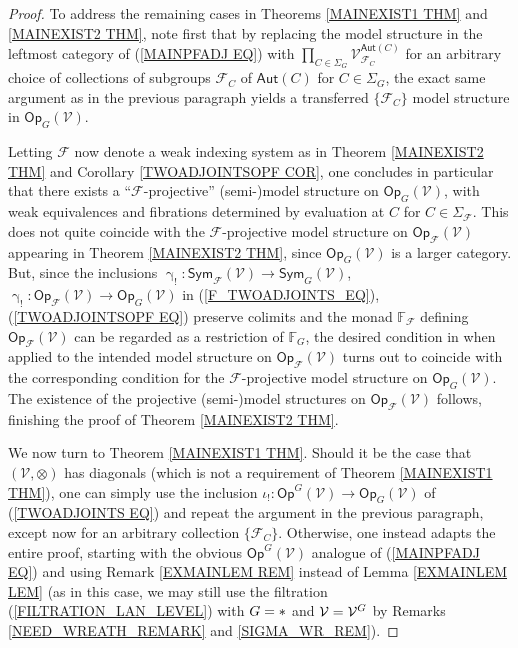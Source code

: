 \documentclass[a4paper,10pt]{article}%
\begin{document}
\begin{proof}
To address the remaining cases in 
Theorems \ref{MAINEXIST1 THM} and \ref{MAINEXIST2 THM}, note first that by replacing 
the model structure in the leftmost category of (\ref{MAINPFADJ EQ})
with
$\prod_{C \in \Sigma_G} \mathcal{V}^{\mathsf{Aut}(C)}_{\mathcal{F}_C}$
for an arbitrary choice of collections of 
subgroups $\mathcal{F}_C$ of $\mathsf{Aut}(C)$ for
$C \in \Sigma_G$, 
the exact same argument as in the previous paragraph yields a transferred 
$\{\mathcal{F}_C\}$ model structure in $\mathsf{Op}_G(\mathcal{V})$.

Letting $\mathcal{F}$ now denote a weak indexing system as in Theorem \ref{MAINEXIST2 THM}
and Corollary \ref{TWOADJOINTSOPF COR},
one concludes in particular that there exists a 
``$\mathcal{F}$-projective''
(semi-)model structure on 
$\mathsf{Op}_G(\mathcal{V})$,
with weak equivalences and fibrations determined by evaluation at $C$ for $C \in \Sigma_{\mathcal{F}}$.
This does not quite coincide with the 
$\mathcal{F}$-projective model structure on
$\mathsf{Op}_{\mathcal{F}}(\mathcal{V})$
appearing in Theorem \ref{MAINEXIST2 THM},
since $\mathsf{Op}_G(\mathcal{V})$ is a larger category.
But, since the inclusions
$\upgamma_! \colon 
\mathsf{Sym}_{\mathcal{F}}(\mathcal{V})
	\to
\mathsf{Sym}_{G}(\mathcal{V})$, 
$\upgamma_! \colon 
\mathsf{Op}_{\mathcal{F}}(\mathcal{V})
	\to
\mathsf{Op}_{G}(\mathcal{V})$
in (\ref{F_TWOADJOINTS_EQ}), (\ref{TWOADJOINTSOPF EQ}) 
preserve colimits and the monad 
$\mathbb{F}_{\mathcal{F}}$
defining $\mathsf{Op}_{\mathcal{F}}(\mathcal{V})$
can be regarded as a restriction of
$\mathbb{F}_G$,
the desired condition in 
\cite[Thm. 11.3.2(2)]{Hi03}
when
applied to the intended model structure on 
$\mathsf{Op}_{\mathcal{F}}(\mathcal{V})$
turns out to coincide with the corresponding  condition for the $\mathcal{F}$-projective model structure on $\mathsf{Op}_{G}(\mathcal{V})$.
The existence of the projective (semi-)model structures on $\mathsf{Op}_{\mathcal{F}}(\mathcal{V})$ follows,
finishing the proof of Theorem \ref{MAINEXIST2 THM}.

We now turn to Theorem \ref{MAINEXIST1 THM}.
Should it be the case that 
$(\mathcal{V},\otimes)$ has diagonals 
(which is not a requirement of Theorem \ref{MAINEXIST1 THM}),
one can simply use the inclusion
$\iota_{!} \colon \mathsf{Op}^G(\mathcal{V})
\to 
\mathsf{Op}_G(\mathcal{V})$ of (\ref{TWOADJOINTS EQ}) and repeat the argument in the previous paragraph, except now for an arbitrary collection
$\{\mathcal{F}_C\}$.
Otherwise, one instead adapts the entire proof,
starting with the obvious $\mathsf{Op}^G(\mathcal{V})$ analogue
of (\ref{MAINPFADJ EQ})
and using Remark \ref{EXMAINLEM REM}
instead of Lemma \ref{EXMAINLEM LEM}
(as in this case, we may still use the filtration (\ref{FILTRATION_LAN_LEVEL}) with $G = \**$ and $\mathcal V = \mathcal V^G$ by Remarks \ref{NEED_WREATH_REMARK} and \ref{SIGMA_WR_REM}).
\end{proof}
\end{document}
